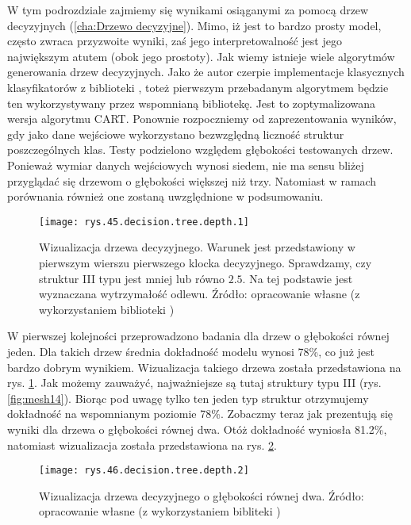 W tym podrozdziale zajmiemy się wynikami osiąganymi za pomocą drzew decyzyjnych (\ref{cha:Drzewo decyzyjne}). Mimo, iż jest to bardzo prosty model, często zwraca przyzwoite wyniki, zaś jego interpretowalność jest jego największym atutem (obok jego prostoty). 
Jak wiemy istnieje wiele algorytmów generowania drzew decyzyjnych. Jako że autor czerpie implementacje klasycznych klasyfikatorów z biblioteki , toteż pierwszym przebadanym algorytmem będzie ten wykorzystywany przez wspomnianą bibliotekę. Jest to zoptymalizowana wersja algorytmu CART.
Ponownie rozpoczniemy od zaprezentowania wyników, gdy jako dane wejściowe wykorzystano bezwzględną liczność struktur poszczególnych klas. Testy podzielono względem głębokości testowanych drzew. Ponieważ wymiar danych wejściowych wynosi siedem, nie ma sensu bliżej przyglądać się drzewom o głębokości większej niż trzy. Natomiast w ramach porównania również one zostaną uwzględnione w podsumowaniu. 
\begin{figure}[h]
    \centering
    \texttt{[image: rys.45.decision.tree.depth.1]}
    \caption{Wizualizacja drzewa decyzyjnego. Warunek jest przedstawiony w pierwszym wierszu pierwszego klocka decyzyjnego. Sprawdzamy, czy struktur III typu jest mniej lub równo $2.5$. Na tej podstawie jest wyznaczana wytrzymałość odlewu. Źródło: opracowanie własne (z wykorzystaniem biblioteki )}
    \label{rys.45.decision.tree.depth.1}
\end{figure}
W pierwszej kolejności przeprowadzono badania dla drzew o głębokości równej jeden. Dla takich drzew średnia dokładność modelu wynosi 78\%, co już jest bardzo dobrym wynikiem. Wizualizacja takiego drzewa została przedstawiona na rys. \ref{rys.45.decision.tree.depth.1}. 
Jak możemy zauważyć, najważniejsze są tutaj struktury typu III (rys. \ref{fig:mesh14}). Biorąc pod uwagę tylko ten jeden typ struktur otrzymujemy dokładność na wspomnianym poziomie 78\%. Zobaczmy teraz jak prezentują się wyniki dla drzewa o głębokości równej dwa. Otóż dokładność wyniosła 81.2\%, natomiast wizualizacja została przedstawiona na rys. \ref{rys.46.decision.tree.depth.2}. 
\begin{figure}[h]
    \centering
    \texttt{[image: rys.46.decision.tree.depth.2]}
    \caption{Wizualizacja drzewa decyzyjnego o głębokości równej dwa. Źródło: opracowanie własne (z wykorzystaniem bibliteki )}
    \label{rys.46.decision.tree.depth.2}
\end{figure}
